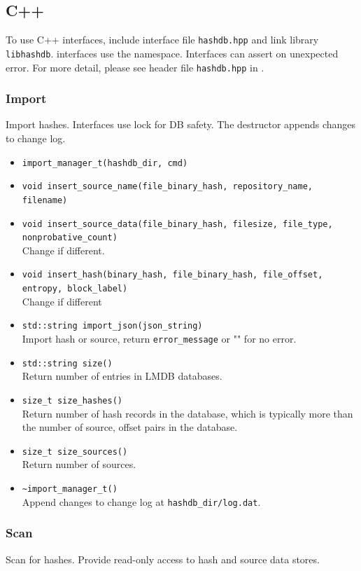 \documentclass[11pt,fleqn]{article} %
\begin{document}
\subsection{C++}
To use C++ interfaces, include interface file \verb+hashdb.hpp+ and link \hdb library \verb+libhashdb+. \hdb interfaces use the \hdb namespace. Interfaces can assert on unexpected error. For more detail, please see \hdb header file \texttt{hashdb.hpp} in \textbf{}.\\

\subsubsection{Import}
Import hashes. Interfaces use lock for DB safety. The destructor appends changes to change log.

\begin{itemize}
\item \verb+import_manager_t(hashdb_dir, cmd)+
\item \verb+void insert_source_name(file_binary_hash, repository_name, filename)+
\item \verb+void insert_source_data(file_binary_hash, filesize, file_type, nonprobative_count)+\\
Change if different.
\item \verb+void insert_hash(binary_hash, file_binary_hash, file_offset, entropy, block_label)+\\
Change if different
\item \verb+std::string import_json(json_string)+\\
Import hash or source, return \verb+error_message+ or "" for no error.
\item \verb+std::string size()+\\
Return number of entries in LMDB databases.
\item \verb+size_t size_hashes()+\\
Return number of hash records in the database, which is typically more than the number of source, offset pairs in the database.
\item \verb+size_t size_sources()+\\
Return number of sources.
\item \verb+~import_manager_t()+\\
Append changes to change log at \verb+hashdb_dir/log.dat+.
\end{itemize}

\subsubsection{Scan}
Scan for hashes. Provide read-only access to hash and source data stores.
\end{document}
